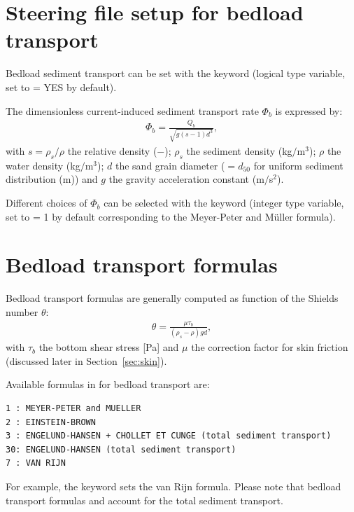 \section{Steering file setup for bedload transport}
Bedload sediment transport can be set with the keyword  (logical type variable, set to {\ttfamily = YES} by default).

The dimensionless current-induced sediment transport rate $\Phi_b$ is expressed by:
\begin{align}
\Phi_b = \frac{Q_b}{\sqrt{g(s-1)d^3}},
\label{eq:Phis}
\end{align}
with $s=\rho_s/\rho$ the relative density ($-$); $\rho_s$ the sediment density (kg$/$m$^3$); $\rho$ the water density (kg$/$m$^3$); $d$ the sand grain diameter ($=d_{50}$ for uniform sediment distribution (m)) and $g$ the gravity acceleration constant (m$/$s$^2$).

Different choices of $\Phi_b$ can be selected with the keyword  (integer type variable, set to {\ttfamily = 1} by default corresponding to the Meyer-Peter and M\"uller formula).

\section{Bedload transport formulas}
Bedload transport formulas are generally computed as function of the Shields number $\theta$:
\begin{align}
\theta=\frac{\mu\tau_b}{(\rho_s-\rho)gd}, 
\label{eq:shieldsp}
\end{align}
with $\tau_b$ the bottom shear stress [Pa] and $\mu$ the correction factor for skin friction (discussed later in Section~\ref{sec:skin}).

Available formulas in \sisyphe{} for bedload transport are:
\begin{lstlisting}[frame=trBL]
1 : MEYER-PETER and MUELLER
2 : EINSTEIN-BROWN 
3 : ENGELUND-HANSEN + CHOLLET ET CUNGE (total sediment transport)
30: ENGELUND-HANSEN (total sediment transport)
7 : VAN RIJN 
\end{lstlisting}
For example, the keyword  sets the van Rijn formula. Please note that bedload transport formulas  and  account for the total sediment transport.

